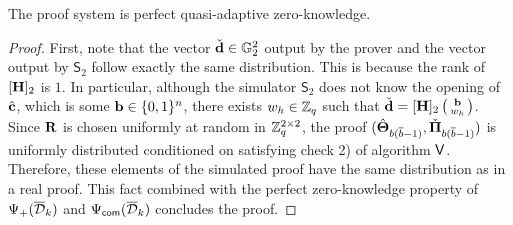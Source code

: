 \begin{theorem}
The proof system is perfect quasi-adaptive zero-knowledge.
\end{theorem} 
\begin{proof}  First, note that the vector $\check{\mathbf{d}} \in \mathbb{G}_2^2$ output by the prover and the vector output by $\mathsf{S}_2$ follow exactly the same distribution. This is because the rank of $[{\mathbf{{H}}}]_2$ is $1$. In particular, although the simulator $\mathsf{S}_2$ does not know the opening of ${\hat{\mathbf{c}}}$, which is some $\mathbf{b} \in \{0,1\}^{n}$, 
there exists $w_h \in \mathbb{Z}_q$ such that $\check{\mathbf{d}}=[{\mathbf{{H}}}]_2\left(\begin{smallmatrix}\mathbf{b}\\ w_h\end{smallmatrix}\right)$. 
Since $\mathbf{{R}}$ is chosen uniformly at random in $\mathbb{Z}_q^{2 \times 2}$, the proof $({\hat{\mathbf{{\Theta}}}}_{b(\overline{b}-1)}, \check{\mathbf{{\Pi}}}_{b(\overline{b}-1)})$ is uniformly distributed conditioned on satisfying check 2) of algorithm $\mathsf{V}$.
Therefore, these elements of the simulated proof have the same distribution as in a real proof. This fact combined with the perfect zero-knowledge property of ${\Psi_{+}(\overline{\mathcal{D}}_k)}$  and ${{\Psi_{\mathsf{com}}(\overline{\mathcal{D}}_k)}}$ concludes the proof. 
\end{proof}


